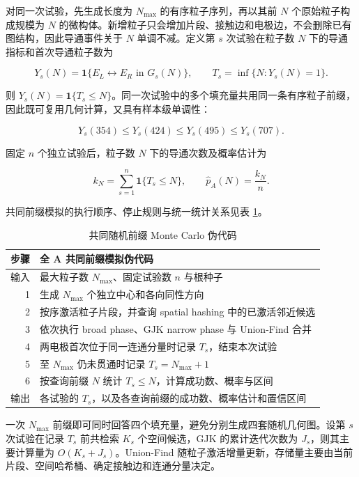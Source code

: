 对同一次试验，先生成长度为 \(N_{\max}\) 的有序粒子序列，再以其前 \(N\) 个原始粒子构成规模为 \(N\) 的微构体。新增粒子只会增加片段、接触边和电极边，不会删除已有图结构，因此导通事件关于 \(N\) 单调不减。定义第 \(s\) 次试验在粒子数 \(N\) 下的导通指标和首次导通粒子数为

\[
Y_s(N)=\mathbf 1\{E_L\leftrightarrow E_R\text{ in }G_s(N)\},\qquad
T_s=\inf\{N:Y_s(N)=1\}.
\]

则 \(Y_s(N)=\mathbf 1\{T_s\leq N\}\)。同一次试验中的多个填充量共用同一条有序粒子前缀，因此既可复用几何计算，又具有样本级单调性：

\[
Y_s(354)\leq Y_s(424)\leq Y_s(495)\leq Y_s(707).
\]

固定 \(n\) 个独立试验后，粒子数 \(N\) 下的导通次数及概率估计为

\[
k_N=\sum_{s=1}^n\mathbf 1\{T_s\leq N\},\qquad
\widehat p_A(N)=\frac{k_N}{n}.
\]

共同前缀模拟的执行顺序、停止规则与统一统计关系见表 \ref{tab:q2-shared-prefix-pseudocode}。

\begin{table}[H]
\centering
\caption{共同随机前缀 Monte Carlo 伪代码}
\label{tab:q2-shared-prefix-pseudocode}
\begin{tabular}{@{}rl@{}}
\toprule
步骤 & 全 A 共同前缀模拟伪代码 \\
\midrule
输入 & 最大粒子数 \(N_{\max}\)、固定试验数 \(n\) 与根种子 \\
1 & 生成 \(N_{\max}\) 个独立中心和各向同性方向 \\
2 & 按序激活粒子片段，并查询 spatial hashing 中的已激活邻近候选 \\
3 & 依次执行 broad phase、GJK narrow phase 与 Union-Find 合并 \\
4 & 两电极首次位于同一连通分量时记录 \(T_s\)，结束本次试验 \\
5 & 至 \(N_{\max}\) 仍未贯通时记录 \(T_s=N_{\max}+1\) \\
6 & 按查询前缀 \(N\) 统计 \(T_s\leq N\)，计算成功数、概率与区间 \\
输出 & 各试验的 \(T_s\)，以及各查询前缀的成功数、概率估计和置信区间 \\
\bottomrule
\end{tabular}
\end{table}

一次 \(N_{\max}\) 前缀即可同时回答四个填充量，避免分别生成四套随机几何图。设第 \(s\) 次试验在记录 \(T_s\) 前共检索 \(K_s\) 个空间候选，GJK 的累计迭代次数为 \(J_s\)，则其主要计算量为 \(O(K_s+J_s)\)。Union-Find 随粒子激活增量更新，存储量主要由当前片段、空间哈希桶、确定接触边和连通分量决定。

